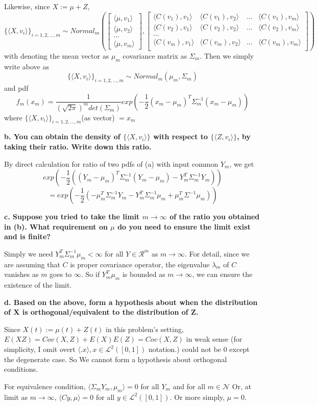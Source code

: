 \documentclass{article}
\begin{document}
Likewise, since $X:=\mu+Z$,
\[\{\langle X, v_i\rangle\}_{i=1,2,...,m} \sim Normal_m(
\begin{bmatrix}
    \langle \mu,v_1 \rangle \\
    \langle \mu,v_2 \rangle \\
    ... \\
    \langle \mu,v_m \rangle
\end{bmatrix}
,
\begin{bmatrix}
    \langle C(v_1),v_1 \rangle & \langle C(v_1),v_2 \rangle & ... & \langle C(v_1),v_m \rangle \\
    \langle C(v_2),v_1 \rangle & \langle C(v_2),v_2 \rangle & ... & \langle C(v_2),v_m \rangle \\
    ... \\
    \langle C(v_m),v_1 \rangle & \langle C(v_m),v_2 \rangle & ... & \langle C(v_m),v_m \rangle \\
\end{bmatrix}
)\]
with denoting the mean vector as $\mu_m$ covariance matrix as $\Sigma_m$. Then we simply write above as
\[\{\langle X, v_i\rangle\}_{i=1,2,...,m} \sim Normal_m(\mu_m,\Sigma_m)\]
and pdf
\[
    f_m(x_m) = \frac{1}{(\sqrt{2\pi})^m det(\Sigma_m)}exp{(-\frac{1}{2}(x_m-\mu_m)^T\Sigma_m^{-1}(x_m-\mu_m))}
\]
where \(\{\langle X, v_i\rangle\}_{i=1,2,...,m}\)(as vector) $=x_m$

\textbf{
b. You can obtain the density of $\{\langle X, v_i\rangle\}$ with respect to $\{\langle Z,v_i \rangle\}$,
by taking their ratio. Write down this ratio.
}

By direct calculation for ratio of two pdfs of (a) with input common $Y_m$, we get
\[exp(-\frac{1}{2}((Y_m-\mu_m)^T\Sigma_m^{-1}(Y_m-\mu_m)-Y_m^T\Sigma_m^{-1}Y_m))\]
\[=exp(-\frac{1}{2}(-\mu_m^T\Sigma_m^{-1}Y_m-Y_m^T\Sigma_m^{-1}\mu_m+\mu_m^T\Sigma^{-1}\mu_m))\]

\textbf{
c. Suppose you tried to take the limit $m \rightarrow \infty$ of the ratio you obtained in (b).
What requirement on $\mu$ do you need to ensure the limit exist and is finite?
}

Simply we need $Y_m^T\Sigma_m^{-1}\mu_m < \infty$ for all $Y\in \mathcal{R}^m$ as $m\rightarrow\infty$.
For detail, since we are assuming that $C$ is proper covariance operator,
the eigenvalue $\lambda_m$ of $C$ vanishes as $m$ goes to $\infty$. So if $Y_m^T\mu_m$ is bounded as $m\rightarrow\infty$,
we can ensure the existence of the limit.

\textbf{
d. Based on the above, form a hypothesis about when the distribution of X is orthogonal/equivalent 
to the distribution of Z.
}

Since $X(t):=\mu(t)+Z(t)$ in this problem's setting, 
$E(XZ)=Cov(X,Z)+E(X)E(Z)=Cov(X,Z)$ in weak sense (for simplicity, I omit overt $\langle .x \rangle, x\in \mathcal{L}^2([0,1])$ notation.)
could not be 0 except the degenerate case. So We cannot form a hypothesis about orthogonal conditions.

For equivalence condition, $\langle \Sigma_mY_m, \mu_m\rangle=0$ for all $Y_m$ and for all $m\in\mathcal{N}$
Or, at limit as $m\rightarrow\infty$, $\langle Cy, \mu\rangle=0$ for all $y\in\mathcal{L}^2([0,1])$.
Or more simply, $\mu=0$.
\end{document}
